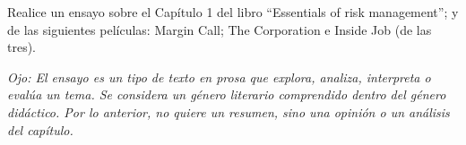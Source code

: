 Realice un ensayo sobre el Capítulo 1 del libro “Essentials of risk
management”; y de las siguientes películas: Margin Call; The
Corporation e Inside Job (de las tres).

\emph{Ojo: El ensayo es un tipo de texto en prosa que explora, analiza,
interpreta o evalúa un tema. Se considera un género literario
comprendido dentro del género didáctico. Por lo anterior, no quiere
un resumen, sino una opinión o un análisis del capítulo.}